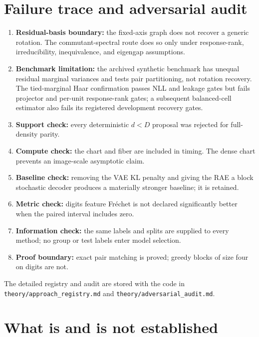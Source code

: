 \section{Failure trace and adversarial audit}

\begin{enumerate}[leftmargin=*]
\item \textbf{Residual-basis boundary:} the fixed-axis graph does not recover a generic rotation.  The commutant-spectral route does so only under response-rank, irreducibility, inequivalence, and eigengap assumptions.
\item \textbf{Benchmark limitation:} the archived synthetic benchmark has unequal residual marginal variances and tests pair partitioning, not rotation recovery.  The tied-marginal Haar confirmation passes NLL and leakage gates but fails projector and per-unit response-rank gates; a subsequent balanced-cell estimator also fails its registered development recovery gates.
\item \textbf{Support check:} every deterministic $d<D$ proposal was rejected for full-density parity.
\item \textbf{Compute check:} the chart and fiber are included in timing.  The dense chart prevents an image-scale asymptotic claim.
\item \textbf{Baseline check:} removing the VAE KL penalty and giving the RAE a block stochastic decoder produces a materially stronger baseline; it is retained.
\item \textbf{Metric check:} digits feature Fr\'echet is not declared significantly better when the paired interval includes zero.
\item \textbf{Information check:} the same labels and splits are supplied to every method; no group or test labels enter model selection.
\item \textbf{Proof boundary:} exact pair matching is proved; greedy blocks of size four on digits are not.
\end{enumerate}
The detailed registry and audit are stored with the code in \texttt{theory/approach\_registry.md} and \texttt{theory/adversarial\_audit.md}.

\section{What is and is not established}

